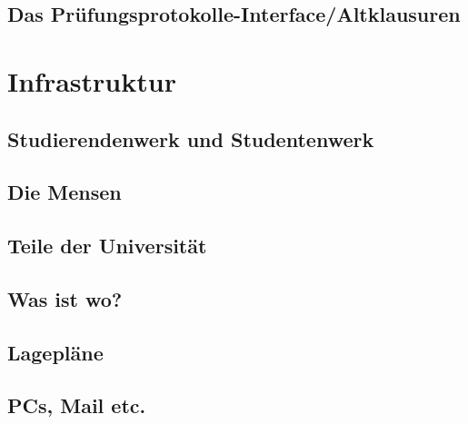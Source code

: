 \documentclass[12pt, a4paper]{article}
\newif\ifinfo
\begin{document}
\subsection{Das Prüfungsprotokolle-Interface/Altklausuren}

\ifinfo
\else
	\vfill
\fi

\ifinfo
	\subsection{Praktika}
	
\fi

\pagebreak

\section{Infrastruktur}
\subsection{Studierendenwerk und Studentenwerk}

\subsection{Die Mensen}


\subsection{Teile der Universität}
\ifinfo
	
\else
	
\fi

\pagebreak

\subsection{Was ist wo?}
\ifinfo
	
\else
	
\fi

\newpage
\subsection{Lagepläne}
\ifinfo
	
\else
	
\fi
\newpage

\subsection{PCs, Mail etc.}

\end{document}
